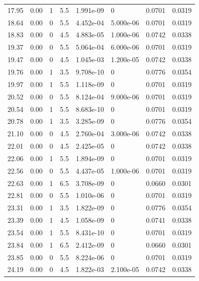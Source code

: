 \documentclass[preview]{standalone}
\begin{document}
{{{\begin{tabular}{L{1.2cm}C{1.2cm} C{0.3cm}C{0.5cm} C{1.4cm}C{1.4cm} C{1.4cm}C{1.4cm}}
  17.95  &  0.00  & 1     & 5.5 &  1.991e-09  & 0  & 0.0701 &  0.0319   \\ 
  18.64  &  0.00  & 0     & 5.5 &  4.452e-04  & 5.000e-06  & 0.0701 &  0.0319   \\ 
  18.83  &  0.00  & 0     & 4.5 &  4.883e-05  & 1.000e-06  & 0.0742 &  0.0338   \\ 
  19.37  &  0.00  & 0     & 5.5 &  5.064e-04  & 6.000e-06  & 0.0701 &  0.0319   \\ 
  19.47  &  0.00  & 0     & 4.5 &  1.045e-03  & 1.200e-05  & 0.0742 &  0.0338   \\ 
  19.76  &  0.00  & 1     & 3.5 &  9.708e-10  & 0  & 0.0776 &  0.0354   \\ 
  19.97  &  0.00  & 1     & 5.5 &  1.118e-09  & 0  & 0.0701 &  0.0319   \\ 
  20.52  &  0.00  & 0     & 5.5 &  8.124e-04  & 9.000e-06  & 0.0701 &  0.0319   \\ 
  20.54  &  0.00  & 1     & 5.5 &  8.683e-10  & 0  & 0.0701 &  0.0319   \\ 
  20.78  &  0.00  & 1     & 3.5 &  3.285e-09  & 0  & 0.0776 &  0.0354   \\ 
  21.10  &  0.00  & 0     & 4.5 &  2.760e-04  & 3.000e-06  & 0.0742 &  0.0338   \\ 
  22.01  &  0.00  & 0     & 4.5 &  2.425e-05  & 0  & 0.0742 &  0.0338   \\ 
  22.06  &  0.00  & 1     & 5.5 &  1.894e-09  & 0  & 0.0701 &  0.0319   \\ 
  22.56  &  0.00  & 0     & 5.5 &  4.437e-05  & 1.000e-06  & 0.0701 &  0.0319   \\ 
  22.63  &  0.00  & 1     & 6.5 &  3.708e-09  & 0  & 0.0660 &  0.0301   \\ 
  22.81  &  0.00  & 0     & 5.5 &  1.010e-06  & 0  & 0.0701 &  0.0319   \\ 
  23.31  &  0.00  & 1     & 3.5 &  1.822e-09  & 0  & 0.0776 &  0.0354   \\ 
  23.39  &  0.00  & 1     & 4.5 &  1.058e-09  & 0  & 0.0741 &  0.0338   \\ 
  23.54  &  0.00  & 1     & 5.5 &  8.431e-10  & 0  & 0.0701 &  0.0319   \\ 
  23.84  &  0.00  & 1     & 6.5 &  2.412e-09  & 0  & 0.0660 &  0.0301   \\ 
  23.85  &  0.00  & 0     & 5.5 &  8.224e-06  & 0  & 0.0701 &  0.0319   \\ 
  24.19  &  0.00  & 0     & 4.5 &  1.822e-03  & 2.100e-05  & 0.0742 &  0.0338   \\ 

\end{tabular}}}}
\end{document}

